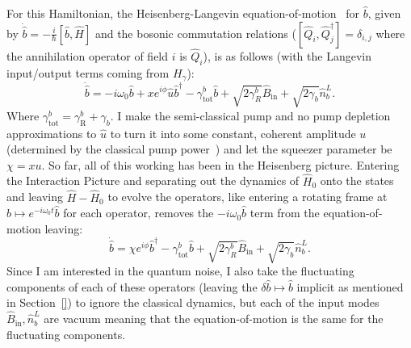 For this Hamiltonian, the Heisenberg-Langevin equation-of-motion~\cite{} for $\hat b$, given by $\dot{\hat b}=-\frac{i}{\hbar}[\hat b,\hat H]$ and the bosonic commutation relations ($[\hat Q_i,\hat Q_j^\dag]=\delta_{i,j}$ where the annihilation operator of field $i$ is $\hat Q_i$), is as follows (with the Langevin input/output terms coming from $H_\gamma$): \begin{equation}\dot{\hat{b}}= -i\omega_0 \hat b+x e^{i\phi} \hat u\hat b^\dag - \gamma^b_\mathrm{tot} \hat{b} + \sqrt{2\gamma^b_R}\hat{B}_\mathrm{in} + \sqrt{2\gamma_b}\hat{n}^L_b.\end{equation} Where $\gamma^b_\text{tot}=\gamma^b_\text{R}+\gamma_b$. I make the semi-classical pump and no pump depletion approximations to $\hat u$ to turn it into some constant, coherent amplitude $u$ (determined by the classical pump power~\cite{}) and let the squeezer parameter be $\chi = x u$. So far, all of this working has been in the Heisenberg picture. Entering the Interaction Picture and separating out the dynamics of $\hat H_0$ onto the states and leaving $\hat H - \hat H_0$ to evolve the operators, like entering a rotating frame at $\hat b \mapsto e^{-i\omega_0 t} \hat b$ for each operator, removes the $-i\omega_0 \hat b$ term from the equation-of-motion leaving: \begin{equation}\dot{\hat{b}}= \chi e^{i\phi}\hat b^\dag - \gamma^b_\mathrm{tot} \hat{b} + \sqrt{2\gamma^b_R}\hat{B}_\mathrm{in} + \sqrt{2\gamma_b}\hat{n}^L_b.\end{equation} Since I am interested in the quantum noise, I also take the fluctuating components of each of these operators (leaving the $\delta \hat b\mapsto\hat b$ implicit as mentioned in Section~\ref{}) to ignore the classical dynamics, but each of the input modes $\hat{B}_\mathrm{in}, \hat{n}^L_b$ are vacuum meaning that the equation-of-motion is the same for the fluctuating components. 

